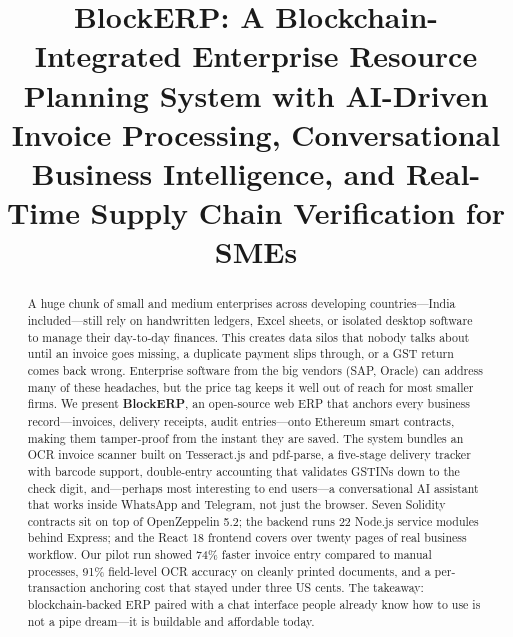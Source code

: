 \documentclass[conference]{IEEEtran}
\begin{document}
\title{BlockERP: A Blockchain-Integrated Enterprise Resource Planning System with AI-Driven Invoice Processing, Conversational Business Intelligence, and Real-Time Supply Chain Verification for SMEs}

\author{
\and
{}
\and
{}
}

\maketitle

\begin{abstract}
A huge chunk of small and medium enterprises across developing countries---India included---still rely on handwritten ledgers, Excel sheets, or isolated desktop software to manage their day-to-day finances. This creates data silos that nobody talks about until an invoice goes missing, a duplicate payment slips through, or a GST return comes back wrong. Enterprise software from the big vendors (SAP, Oracle) can address many of these headaches, but the price tag keeps it well out of reach for most smaller firms. We present \textbf{BlockERP}, an open-source web ERP that anchors every business record---invoices, delivery receipts, audit entries---onto Ethereum smart contracts, making them tamper-proof from the instant they are saved. The system bundles an OCR invoice scanner built on Tesseract.js and pdf-parse, a five-stage delivery tracker with barcode support, double-entry accounting that validates GSTINs down to the check digit, and---perhaps most interesting to end users---a conversational AI assistant that works inside WhatsApp and Telegram, not just the browser. Seven Solidity contracts sit on top of OpenZeppelin 5.2; the backend runs 22 Node.js service modules behind Express; and the React 18 frontend covers over twenty pages of real business workflow. Our pilot run showed 74\% faster invoice entry compared to manual processes, 91\% field-level OCR accuracy on cleanly printed documents, and a per-transaction anchoring cost that stayed under three US cents. The takeaway: blockchain-backed ERP paired with a chat interface people already know how to use is not a pipe dream---it is buildable and affordable today.
\end{abstract}
\end{document}
